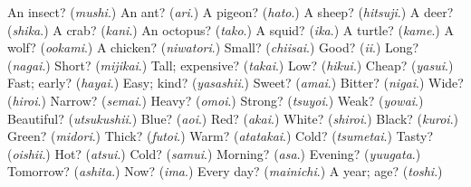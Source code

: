 \begin{tcolorbox}[breakable,colback=teal!4,colframe=teal!35!black,title={Before you move on}]
An insect? (\emph{mushi}.) An ant? (\emph{ari}.) A pigeon? (\emph{hato}.) A sheep? (\emph{hitsuji}.) A deer? (\emph{shika}.) A crab? (\emph{kani}.) An octopus? (\emph{tako}.) A squid? (\emph{ika}.) A turtle? (\emph{kame}.) A wolf? (\emph{ookami}.) A chicken? (\emph{niwatori}.) Small? (\emph{chiisai}.) Good? (\emph{ii}.) Long? (\emph{nagai}.) Short? (\emph{mijikai}.) Tall; expensive? (\emph{takai}.) Low? (\emph{hikui}.) Cheap? (\emph{yasui}.) Fast; early? (\emph{hayai}.) Easy; kind? (\emph{yasashii}.) Sweet? (\emph{amai}.) Bitter? (\emph{nigai}.) Wide? (\emph{hiroi}.) Narrow? (\emph{semai}.) Heavy? (\emph{omoi}.) Strong? (\emph{tsuyoi}.) Weak? (\emph{yowai}.) Beautiful? (\emph{utsukushii}.) Blue? (\emph{aoi}.) Red? (\emph{akai}.) White? (\emph{shiroi}.) Black? (\emph{kuroi}.) Green? (\emph{midori}.) Thick? (\emph{futoi}.) Warm? (\emph{atatakai}.) Cold? (\emph{tsumetai}.) Tasty? (\emph{oishii}.) Hot? (\emph{atsui}.) Cold? (\emph{samui}.) Morning? (\emph{asa}.) Evening? (\emph{yuugata}.) Tomorrow? (\emph{ashita}.) Now? (\emph{ima}.) Every day? (\emph{mainichi}.) A year; age? (\emph{toshi}.)
\end{tcolorbox}
